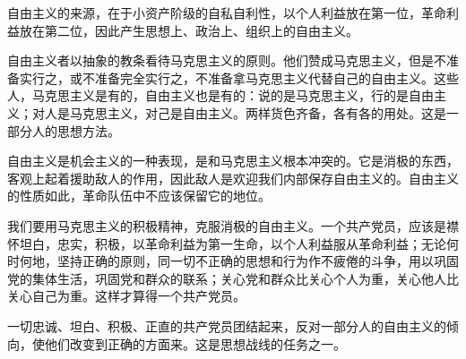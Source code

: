 自由主义的来源，在于小资产阶级的自私自利性，以个人利益放在第一位，革命利益放在第二位，因此产生思想上、政治上、组织上的自由主义。

自由主义者以抽象的教条看待马克思主义的原则。他们赞成马克思主义，但是不准备实行之，或不准备完全实行之，不准备拿马克思主义代替自己的自由主义。这些人，马克思主义是有的，自由主义也是有的：说的是马克思主义，行的是自由主义；对人是马克思主义，对己是自由主义。两样货色齐备，各有各的用处。这是一部分人的思想方法。

自由主义是机会主义的一种表现，是和马克思主义根本冲突的。它是消极的东西，客观上起着援助敌人的作用，因此敌人是欢迎我们内部保存自由主义的。自由主义的性质如此，革命队伍中不应该保留它的地位。

我们要用马克思主义的积极精神，克服消极的自由主义。一个共产党员，应该是襟怀坦白，忠实，积极，以革命利益为第一生命，以个人利益服从革命利益；无论何时何地，坚持正确的原则，同一切不正确的思想和行为作不疲倦的斗争，用以巩固党的集体生活，巩固党和群众的联系；关心党和群众比关心个人为重，关心他人比关心自己为重。这样才算得一个共产党员。

一切忠诚、坦白、积极、正直的共产党员团结起来，反对一部分人的自由主义的倾向，使他们改变到正确的方面来。这是思想战线的任务之一。
